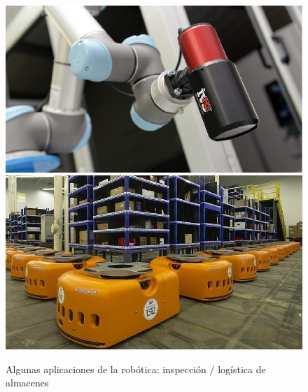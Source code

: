 \documentclass{bmvc2k}
\begin{document}
\begin{figure}[h!]
\begin{center}
\includegraphics[scale=0.25]{Collaborative-Robot-Inspection.png}
\includegraphics[scale=0.2]{amazonlogistics.jpg}
\caption{Algunas aplicaciones de la robótica: inspección / logística de almacenes}
\label{fig:apps}
\end{center}
\end{figure}
\end{document}
